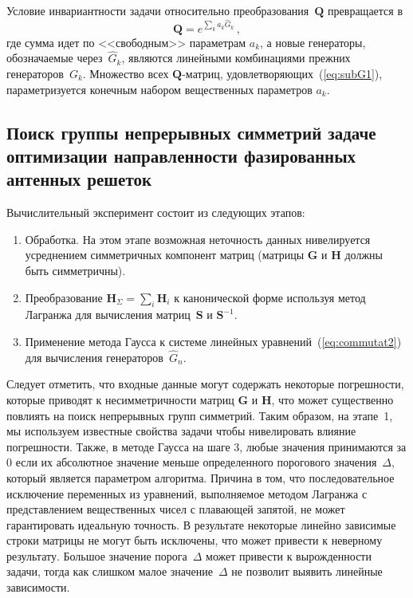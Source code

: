 \documentclass{llncs}
\begin{document}
Условие инвариантности задачи относительно преобразования~$\textbf{Q}$ превращается в
%
\begin{equation}
\label{eq:subG1}
\textbf{Q}=e^{\sum_k a_k \hat{G}_k} \, ,
\end{equation}
%
где сумма идет по <<свободным>> параметрам $a_k$, а новые генераторы, обозначаемые через~$\hat{G}_k$, являются линейными комбинациями прежних генераторов~$G_k$. Множество всех $\textbf{Q}$-матриц, удовлетворяющих~(\ref{eq:subG1}), параметризуется конечным набором вещественных параметров $a_k$.

\subsection*{Поиск группы непрерывных симметрий  задаче оптимизации направленности фазированных антенных решеток}\label{sec:sym:exp}

Вычислительный эксперимент состоит из следующих этапов:
\begin{enumerate}
  \item Обработка. На этом этапе возможная неточность данных нивелируется усреднением симметричных компонент матриц (матрицы $\textbf{G}$ и $\textbf{H}$ должны быть симметричны).
  \item %
  Преобразование $ {\textbf{H}}_{\Sigma} = \sum_{i} \textbf{H}_i$ к канонической форме используя метод Лагранжа для вычисления матриц~$\textbf{S}$ и $\textbf{S}^{-1} $.
  \item Применение метода Гаусса к системе линейных уравнений~(\ref{eq:commutat2}) для вычисления генераторов~$\hat{G}_n$.
\end{enumerate}

Следует отметить, что входные данные могут содержать некоторые погрешности, которые приводят к несимметричности матриц $\textbf{G}$ и $\textbf{H}$, что может существенно повлиять на поиск непрерывных групп симметрий. Таким образом, на этапе~1, мы используем известные свойства задачи чтобы нивелировать влияние погрешности.
Также, в методе Гаусса на шаге 3, любые значения принимаются за 0 если их абсолютное значение меньше определенного порогового значения~$\Delta$, который является параметром алгоритма. Причина в том, что последовательное исключение переменных из уравнений, выполняемое методом Лагранжа с представлением вещественных чисел с плавающей запятой, не может гарантировать идеальную точность.
В результате некоторые линейно зависимые строки матрицы не могут быть исключены, что может привести к неверному результату.
Большое значение порога~$\Delta$ может привести к вырожденности задачи, тогда как слишком малое значение~$\Delta$ не позволит выявить линейные зависимости.
\end{document}
